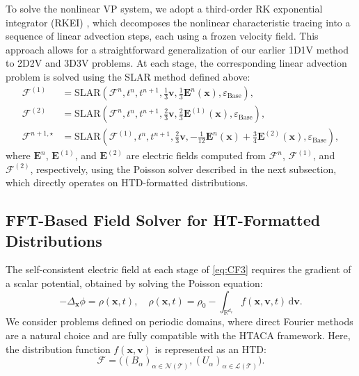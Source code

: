 \documentclass{article}
\theoremstyle{plain}
\theoremstyle{definition}
\theoremstyle{remark}
\begin{document}
To solve the nonlinear VP system, we adopt a third-order RK exponential integrator (RKEI) \cite{cai2021high}, which decomposes the nonlinear characteristic tracing into a sequence of linear advection steps, each using a frozen velocity field.  
This approach allows for a straightforward generalization of our earlier 1D1V method~\cite{zheng2025semi} to 2D2V and 3D3V problems.  
At each stage, the corresponding linear advection problem is solved using the SLAR method defined above:
\begin{equation}\label{eq:CF3}
\begin{aligned}
    \mathcal{F}^{(1)} &= \text{SLAR}(\mathcal{F}^n, t^n, t^{n+1}, \tfrac{1}{3}\bm{v}, \tfrac{1}{3}\bm{E}^n(\bm{x}), \varepsilon_{\text{Base}}), \\
    \mathcal{F}^{(2)} &= \text{SLAR}(\mathcal{F}^n, t^n, t^{n+1}, \tfrac{2}{3}\bm{v}, \tfrac{2}{3}\bm{E}^{(1)}(\bm{x}), \varepsilon_{\text{Base}}), \\
    \mathcal{F}^{n+1,\star} &= \text{SLAR}(\mathcal{F}^{(1)}, t^n, t^{n+1}, \tfrac{2}{3}\bm{v}, -\tfrac{1}{12}\bm{E}^{n}(\bm{x}) + \tfrac{3}{4}\bm{E}^{(2)}(\bm{x}), \varepsilon_{\text{Base}}),
\end{aligned}
\end{equation}
where $\bm{E}^{n}$, $\bm{E}^{(1)}$, and $\bm{E}^{(2)}$ are electric fields computed from $\mathcal{F}^{n}$, $\mathcal{F}^{(1)}$, and $\mathcal{F}^{(2)}$, respectively, using the Poisson solver described in the next subsection, which directly operates on HTD-formatted distributions.


\subsection{FFT-Based Field Solver for HT-Formatted Distributions}\label{sec:FFT_solver}

The self-consistent electric field at each stage of \eqref{eq:CF3} requires the gradient of a scalar potential, obtained by solving the Poisson equation:
\begin{equation}
\label{eq:Poisson equation for phi}
    -\Delta_{\bm{x}} \phi = \rho(\bm{x}, t), 
    \quad 
    \rho(\bm{x}, t) = \rho_0 - \int_{\mathbb{R}^{d_v}} f(\bm{x}, \bm{v}, t) \,\mathrm{d}\bm{v}.
\end{equation}
We consider problems defined on periodic domains, where direct Fourier methods are a natural choice and are fully compatible with the HTACA framework.  
Here, the distribution function $f(\bm{x}, \bm{v})$ is represented as an HTD:
\[
\mathcal{F} = \bigl((B_\alpha)_{\alpha \in \mathcal{N}(\mathcal{T})}, (U_\alpha)_{\alpha \in \mathcal{L}(\mathcal{T})}\bigr).
\]
\end{document}
